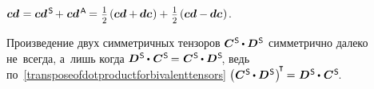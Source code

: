 \begin{otherlanguage}{russian}

\noindent
{}
${\bm{c}\bm{d} \hspace{.1ex} = \bm{c}\bm{d}^{\mathsf{\hspace{.25ex}S}} \hspace{-0.2ex} + \hspace{.1ex} \bm{c}\bm{d}^{\mathsf{\hspace{.25ex}A}} \hspace{-0.16ex} = \hspace{.1ex}
\smalldisplaystyleonehalf \hspace{-0.1ex} \left( \bm{c}\bm{d} + \hspace{-0.1ex} \bm{d}\bm{c} \hspace{.1ex} \right)
+ \hspace{.16ex} \smalldisplaystyleonehalf \hspace{-0.1ex} \left( \bm{c} \bm{d} - \hspace{-0.1ex} \bm{d} \bm{c} \hspace{.1ex} \right)}$.

Произведение двух симметричных тензоров
${\bm{C}^{\mathsf{\hspace{.1ex}S}} \hspace{-0.1ex}\dotp \bm{D}^{\mathsf{\hspace{.1ex}S}}}$
симметрично далеко не~всегда,
а~лишь когда
${\bm{D}^{\mathsf{\hspace{.1ex}S}} \hspace{-0.1ex}\dotp\hspace{.12ex} \bm{C}^{\mathsf{\hspace{.1ex}S}} \hspace{-0.2ex}=\hspace{.1ex} \bm{C}^{\mathsf{\hspace{.1ex}S}} \hspace{-0.1ex}\dotp \bm{D}^{\mathsf{\hspace{.1ex}S}}\hspace{-0.4ex}}$,
ведь по~\eqref{transposeofdotproductforbivalenttensors}
${\left(\hspace{.08ex} \bm{C}^{\mathsf{\hspace{.1ex}S}} \hspace{-0.1ex}\dotp \bm{D}^{\mathsf{\hspace{.1ex}S}} \hspace{.1ex}\right)^{\hspace{-0.32ex}\T} \hspace{-0.16ex} = \hspace{.1ex} \bm{D}^{\mathsf{\hspace{.1ex}S}} \hspace{-0.1ex}\dotp\hspace{.12ex} \bm{C}^{\mathsf{\hspace{.1ex}S}} \hspace{-0.4ex}}$.




\end{otherlanguage}
